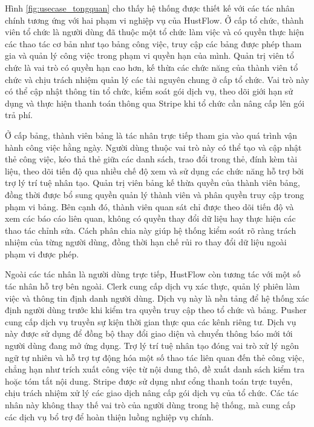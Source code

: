 \documentclass[../DoAn.tex]{subfiles}
\begin{document}
Hình \ref{fig:usecase_tongquan} cho thấy hệ thống được thiết kế với các tác nhân chính tương ứng với hai phạm vi nghiệp vụ của HustFlow. Ở cấp tổ chức, thành viên tổ chức là người dùng đã thuộc một tổ chức làm việc và có quyền thực hiện các thao tác cơ bản như tạo bảng công việc, truy cập các bảng được phép tham gia và quản lý công việc trong phạm vi quyền hạn của mình. Quản trị viên tổ chức là vai trò có quyền hạn cao hơn, kế thừa các chức năng của thành viên tổ chức và chịu trách nhiệm quản lý các tài nguyên chung ở cấp tổ chức. Vai trò này có thể cập nhật thông tin tổ chức, kiểm soát gói dịch vụ, theo dõi giới hạn sử dụng và thực hiện thanh toán thông qua Stripe khi tổ chức cần nâng cấp lên gói trả phí.

Ở cấp bảng, thành viên bảng là tác nhân trực tiếp tham gia vào quá trình vận hành công việc hằng ngày. Người dùng thuộc vai trò này có thể tạo và cập nhật thẻ công việc, kéo thả thẻ giữa các danh sách, trao đổi trong thẻ, đính kèm tài liệu, theo dõi tiến độ qua nhiều chế độ xem và sử dụng các chức năng hỗ trợ bởi trợ lý trí tuệ nhân tạo. Quản trị viên bảng kế thừa quyền của thành viên bảng, đồng thời được bổ sung quyền quản lý thành viên và phân quyền truy cập trong phạm vi bảng. Bên cạnh đó, thành viên quan sát chỉ được theo dõi tiến độ và xem các báo cáo liên quan, không có quyền thay đổi dữ liệu hay thực hiện các thao tác chỉnh sửa. Cách phân chia này giúp hệ thống kiểm soát rõ ràng trách nhiệm của từng người dùng, đồng thời hạn chế rủi ro thay đổi dữ liệu ngoài phạm vi được phép.

Ngoài các tác nhân là người dùng trực tiếp, HustFlow còn tương tác với một số tác nhân hỗ trợ bên ngoài. Clerk cung cấp dịch vụ xác thực, quản lý phiên làm việc và thông tin định danh người dùng. Dịch vụ này là nền tảng để hệ thống xác định người dùng trước khi kiểm tra quyền truy cập theo tổ chức và bảng. Pusher cung cấp dịch vụ truyền sự kiện thời gian thực qua các kênh riêng tư. Dịch vụ này được sử dụng để đồng bộ thay đổi giao diện và chuyển thông báo mới tới người dùng đang mở ứng dụng. Trợ lý trí tuệ nhân tạo đóng vai trò xử lý ngôn ngữ tự nhiên và hỗ trợ tự động hóa một số thao tác liên quan đến thẻ công việc, chẳng hạn như trích xuất công việc từ nội dung thô, đề xuất danh sách kiểm tra hoặc tóm tắt nội dung. Stripe được sử dụng như cổng thanh toán trực tuyến, chịu trách nhiệm xử lý các giao dịch nâng cấp gói dịch vụ của tổ chức. Các tác nhân này không thay thế vai trò của người dùng trong hệ thống, mà cung cấp các dịch vụ bổ trợ để hoàn thiện luồng nghiệp vụ chính.
\end{document}
